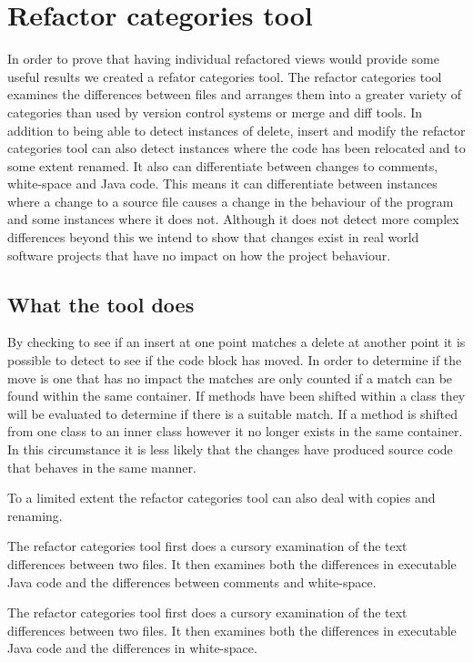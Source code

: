 
\chapter{Refactor categories tool}
In order to prove that having individual refactored views would provide some useful results we created a refator categories tool. The refactor categories tool examines the differences between files and arranges them into a greater variety of categories than used by version control systems or merge and diff tools.  In addition to being able to detect instances of delete, insert and modify the refactor categories tool can also detect instances where the code has been relocated and to some extent renamed.  It also can differentiate between changes to comments, white-space and Java code. This means it can differentiate between instances where a change to a source file causes a change in the behaviour of the program and some instances where it does not. Although it does not detect more complex differences beyond this we intend to show that changes exist in real world software projects that have no impact on how the project behaviour.

\section{What the tool does}

By checking to see if an insert at one point matches a delete at another point it is possible to detect to see if the code block has moved. In order to determine if the move is one that has no impact the matches are only counted if a match can be found within the same container.  If methods have been shifted within a class they will be evaluated to determine if there is a suitable match.  If a method is shifted from one class to an inner class however it no longer exists in the same container.  In this circumstance it is less likely that the changes have produced source code that behaves in the same manner.

To a limited extent the refactor categories tool can also deal with copies and renaming.

The refactor categories tool first does a cursory examination of the text differences between two files. It then examines both the differences in executable Java code and the differences between comments and white-space. 


The refactor categories tool first does a cursory examination of the text differences between two files. It then examines both the differences in executable Java code and the differences in white-space.


